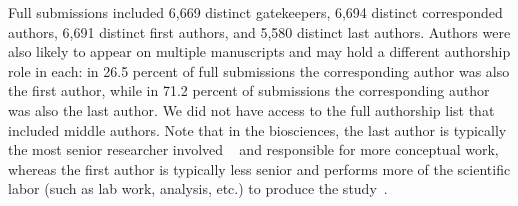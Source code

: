 \documentclass[10pt,letterpaper]{article}
\begin{document}
Full submissions included 6,669 distinct gatekeepers, 6,694 distinct corresponded authors, 6,691 distinct first authors, and 5,580 distinct last authors. Authors were also likely to appear on multiple manuscripts and may hold a different authorship role in each: in 26.5 percent of full submissions the corresponding author was also the first author, while in 71.2 percent of submissions the corresponding author was also the last author. We did not have access to the full authorship list that included middle authors. Note that in the biosciences, the last author is typically the most senior researcher involved ~\cite{costas_age_2011} and responsible for more conceptual work, whereas the first author is typically less senior and performs more of the scientific labor (such as lab work, analysis, etc.) to produce the study~\cite{macaluso_is_2016, baerlocher_meaning_2007, tscharntke_author_2007}.

\end{document}
